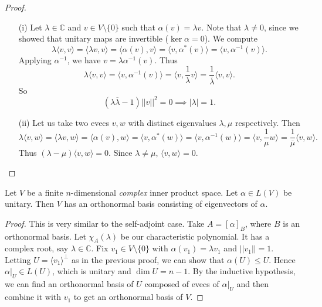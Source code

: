 \documentclass[a4paper]{scrartcl}
\begin{document}
\begin{proof}
      \begin{itemize}
           \item[(i)] Let $\lambda \in \mathbb{C}$ and $v \in V \setminus \{0\}$ such that $\alpha (v)=\lambda v$. Note that $\lambda \neq 0$, since we showed that unitary maps are invertible ($\operatorname{ker}\alpha =0$). We compute 
           \[\lambda \langle v,v \rangle =\langle \lambda v, v \rangle =\langle \alpha (v), v \rangle =\langle v,\alpha^* (v) \rangle =\langle v,{\alpha}^{-1} (v) \rangle .\]
           Applying ${\alpha}^{-1}$, we have $v=\lambda{\alpha}^{-1}(v)$. Thus 
           \[\lambda \langle v,v \rangle =\langle v, {\alpha }^{-1}(v) \rangle=\langle v,\frac{1}{\lambda}v \rangle =\frac{1}{\overline{\lambda} }\langle v,v \rangle .\]
           So 
           \begin{equation*}
                 (\lambda \overline{\lambda}-1 ) ||v||^2=0 \implies |\lambda|=1.
           \end{equation*}
          \item[(ii)]Let us take two evecs $v,w$ with distinct eigenvalues $\lambda, \mu $ respectively. Then 
          \[\lambda \langle v,w \rangle =\langle \lambda v, w \rangle =\langle \alpha (v), w \rangle =\langle v, \alpha^* (w) \rangle =\langle v, {\alpha}^{-1} (w) \rangle =\langle v,\frac{1}{\mu}w \rangle=\frac{1}{\overline{\mu} } \langle v,w \rangle .\]
          Thus $(\lambda-\mu) \langle v,w \rangle =0$. Since $\lambda \neq \mu$, $\langle v,w \rangle =0$.
           
      \end{itemize}
\end{proof}

\begin{theorem}
      Let $V$ be a finite $n$-dimensional \emph{complex} inner product space. Let $\alpha \in L (V)$ be unitary. Then $V$ has an orthonormal basis consisting of eigenvectors of $\alpha $.
\end{theorem}
\begin{proof}
      This is very similar to the self-adjoint case. Take $A=[\alpha]_B$, where $B$ is an orthonormal basis. Let $\chi_A (\lambda)$ be our characteristic polynomial. It has a complex root, say $\lambda \in \mathbb{C}$. Fix $v_1 \in V \setminus \{0\}$ with $\alpha (v_1)= \lambda v_1$ and $||v_1||=1$. Letting $U=\langle v_1 \rangle ^\perp $ as in the previous proof, we can show that $\alpha (U) \leq U$. Hence $\alpha|_U \in L (U)$, which is unitary and $\operatorname{dim} U=n-1$. By the inductive hypothesis, we can find an orthonormal basis of $U$ composed of evecs of $\alpha|_U $ and then combine it with $v_1$ to get an orthonormal basis of $V$.
\end{proof}
\end{document}
